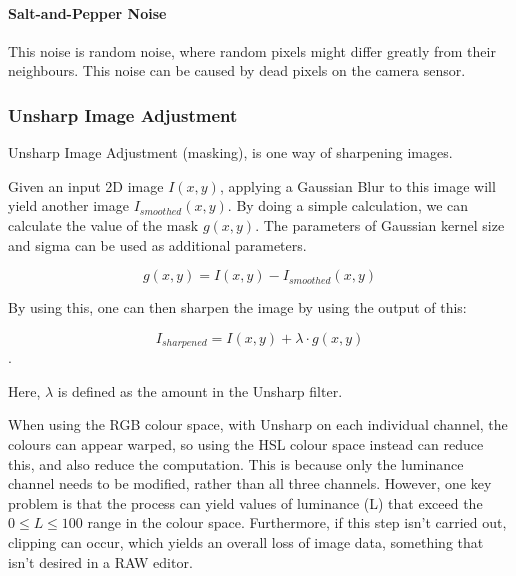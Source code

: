 \documentclass[11pt,a4paper]{article}
\begin{document}
\paragraph{Salt-and-Pepper Noise}
    This noise is random noise, where random pixels might differ greatly from their neighbours. This noise can be caused
    by dead pixels on the camera sensor. \cite{NRandFiltering}
    



\subsubsection{Unsharp Image Adjustment}
    Unsharp Image Adjustment (masking), is one way of sharpening images.

    Given an input 2D image $I(x, y)$, applying a Gaussian Blur to this image will yield another image $I_{smoothed}(x, y)$.
    By doing a simple calculation, we can calculate the value of the mask $g(x, y)$. The parameters of Gaussian kernel size and 
    sigma can be used as additional parameters.

    $$g(x, y) = I(x, y) -  I_{smoothed}(x, y)$$

    By using this, one can then sharpen the image by using the output of this:

    $$I_{sharpened} = I(x, y) + \lambda \cdot g(x, y)$$.

    Here, $\lambda$ is defined as the amount in the Unsharp filter.
    
    \cite{Unsharp}

    When using the RGB colour space, with Unsharp on each individual channel, the colours can appear warped, so using the HSL colour space instead
    can reduce this, and also reduce the computation. This is because only the luminance channel needs to be modified, rather than all three channels.
    However, one key problem is that the process can yield values of luminance (L) that exceed the $0 \le L \le 100$ range in the colour space.
    Furthermore, if this step isn't carried out, clipping can occur, which yields an overall loss of image data, something that isn't desired in a RAW editor.
    
\end{document}
